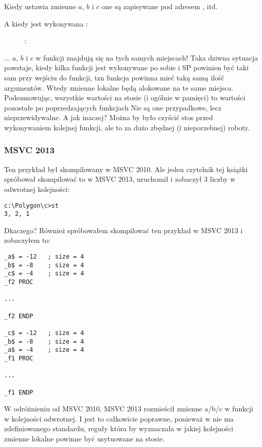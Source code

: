 Kiedy  ustawia zmienne $a$, $b$ i $c$ one są zapisywane pod adresem , itd.

\clearpage
A kiedy jest wykonywana :

\begin{figure}[H]
\centering
{}
\caption{\olly: }
\label{fig:stack_noise_olly2}
\end{figure}

... $a$, $b$ i $c$ w funkcji  znajdują się na tych samych miejscach!
Taka dziwna sytuacja powstaje, kiedy kilka funkcji jest wykonywane po sobie
i \ac{SP} powinien być taki sam przy wejściu do funkcji, tzn funkcja powinna mieć taką samą ilość argumentów. 
Wtedy zmienne lokalne będą alokowane na te same miejsca.
Podsumowując, wszystkie wartości na stosie (i ogólnie w pamięci) to wartości pozostałe po poprzedzających funkcjach
Nie są one przypadkowe, lecz nieprzewidywalne.
A jak inaczej?
Można by było czyścić stos przed wykonywaniem kolejnej funkcji,
ale to za dużo zbędnej (i nieporzebnej) roboty.

\subsubsection{MSVC 2013}

Ten przykład był skompilowany w MSVC 2010.
Ale jeden czytelnik tej książki spróbował skompilować to w MSVC 2013, uruchomił i zobaczył 3 liczby w odwrotnej kolejności:

\begin{lstlisting}
c:\Polygon\c>st
3, 2, 1
\end{lstlisting}

Dkaczego?
Również spróbowałem skompilować ten przykład w MSVC 2013 i zobaczyłem to:

\begin{lstlisting}[caption=MSVC 2013,style=customasmx86]
_a$ = -12	; size = 4
_b$ = -8	; size = 4
_c$ = -4	; size = 4
_f2	PROC

...

_f2	ENDP

_c$ = -12	; size = 4
_b$ = -8	; size = 4
_a$ = -4	; size = 4
_f1	PROC

...

_f1	ENDP
\end{lstlisting}

W odróżnieniu od MSVC 2010, MSVC 2013 rozmieścił zmienne a/b/c w funkcji  w kolejności odwrotnej.
I jest to całkowicie poprawne, ponieważ w \CCpp nie ma zdefiniowanego standardu, reguły która by wyznaczała w jakiej kolejności zmienne lokalne powinne być usytuowane na stosie.


